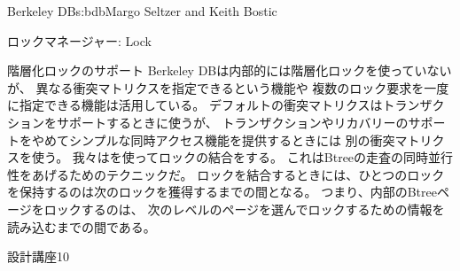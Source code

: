 \begin{aosachapter}{Berkeley DB}{s:bdb}{Margo Seltzer and Keith Bostic}
\begin{aosasect1}{ロックマネージャー: Lock}
\begin{aosasect2}{階層化ロックのサポート}
Berkeley DBは内部的には階層化ロックを使っていないが、
異なる衝突マトリクスを指定できるという機能や
複数のロック要求を一度に指定できる機能は活用している。
デフォルトの衝突マトリクスはトランザクションをサポートするときに使うが、
トランザクションやリカバリーのサポートをやめてシンプルな同時アクセス機能を提供するときには
別の衝突マトリクスを使う。
我々はを使ってロックの結合をする。
これはBtreeの走査の同時並行性をあげるためのテクニックだ\cite{bib:comer:btree}。
ロックを結合するときには、ひとつのロックを保持するのは次のロックを獲得するまでの間となる。
つまり、内部のBtreeページをロックするのは、
次のレベルのページを選んでロックするための情報を読み込むまでの間である。

\begin{aosabox}{設計講座10}


\end{aosabox}
\end{aosasect2}
\end{aosasect1}
\end{aosachapter}
